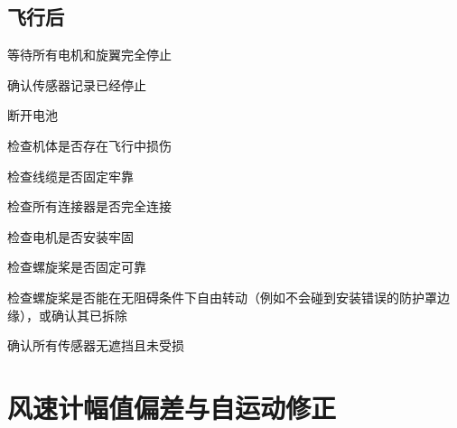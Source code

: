 \subsection{飞行后}
\label{apen1:post}

\begin{checklist}
    \item 等待所有电机和旋翼完全停止
    \item 确认传感器记录已经停止
    \item 断开电池
    \item 检查机体是否存在飞行中损伤
    \item 检查线缆是否固定牢靠
    \item 检查所有连接器是否完全连接
    \item 检查电机是否安装牢固
    \item 检查螺旋桨是否固定可靠
    \item 检查螺旋桨是否能在无阻碍条件下自由转动（例如不会碰到安装错误的防护罩边缘），或确认其已拆除
    \item 确认所有传感器无遮挡且未受损
\end{checklist}

\section{风速计幅值偏差与自运动修正}
\label{chap:bias}

